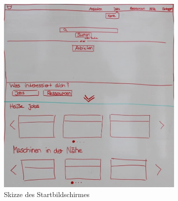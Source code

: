 \begin{figure}
    \centering
    \begin{subfigure}[b]{0.45\textwidth}
		\includegraphics[width=\textwidth]{99_IMG/03_Umsetzung/homeWireframe_5.jpg}
		\caption{Skizze des Startbildschirmes}
		\label{fig:homeWireframe}
    \end{subfigure}
    ~ %
    \begin{subfigure}[b]{0.45\textwidth}

\end{subfigure}
\end{figure}
